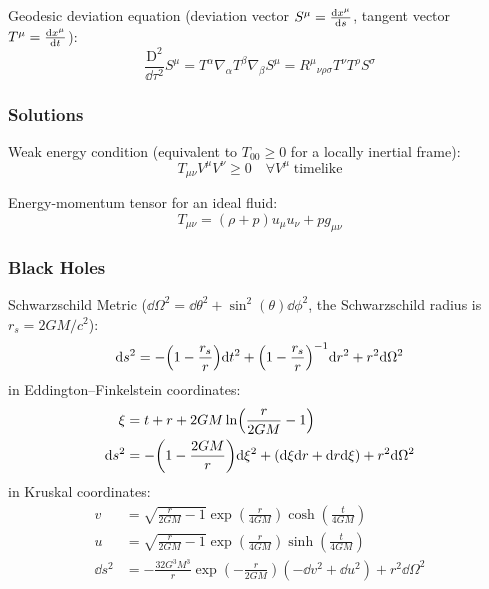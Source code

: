 			\noindent
			Geodesic deviation equation (deviation vector $S^\mu = \dv{x^\mu}{s}$, tangent vector $T^\mu = \dv{x^\mu}{t}$):
			\begin{equation}
				\frac{\mathrm{D}^2}{\dd \tau^2} S^\mu
				= T^\alpha \nabla_\alpha T^\beta \nabla_\beta S^\mu
				= R^\mu{}_{\nu\rho\sigma} T^\nu T^\rho S^\sigma
			\end{equation}


		\subsubsection{Solutions}
			Weak energy condition (equivalent to $T_{00} \ge 0$ for a locally inertial frame):
			\begin{equation}
				\label{Eq:WeakEnergyCondition}
				T_{\mu\nu} V^\mu V^\nu \ge 0 \quad \forall V^\mu\;\text{timelike}
			\end{equation}

			\noindent
			Energy-momentum tensor for an ideal fluid:
			\begin{equation}
				T_{\mu\nu} = (\rho + p)u_\mu u_\nu + p g_{\mu\nu}
			\end{equation}

		\subsubsection{Black Holes}
			Schwarzschild Metric ($\dd \Omega^2 = \dd \theta^2 + \sin^2(\theta) \dd \phi^2$, the Schwarzschild radius is $r_s = 2 G M/c^2$):
			\begin{equation}
				\dd s^2 = - \qty(1-\frac{r_s}{r}) \dd t^2 + \qty(1 - \frac{r_s}{r})^{-1} \dd r^2 + r^2 \dd \Omega^2
			\end{equation}
			in Eddington--Finkelstein coordinates:
			\begin{equation}
				\begin{aligned}
					\xi &= t + r + 2 G M \ln(\frac{r}{2 G M} - 1) \\
					\dd s^2 &= -\qty(1-\frac{2 G M}{r}) \dd \xi^2 + (\dd \xi \dd r + \dd r \dd \xi) + r^2\dd \Omega^2
				\end{aligned}
			\end{equation}
			in Kruskal coordinates:
			\begin{equation}
				\begin{aligned}
					v &= \sqrt{\frac{r}{2 G M} - 1} \exp(\frac{r}{4 G M}) \cosh(\frac{t}{4 G M}) \\
					u &= \sqrt{\frac{r}{2 G M} - 1} \exp(\frac{r}{4 G M}) \sinh(\frac{t}{4 G M}) \\
					\dd s^2 &= -\frac{32 G^3 M^3}{r} \exp(-\frac{r}{2 G M}) (-\dd v^2 + \dd u^2) + r^2 \dd \Omega^2
				\end{aligned}
			\end{equation}

